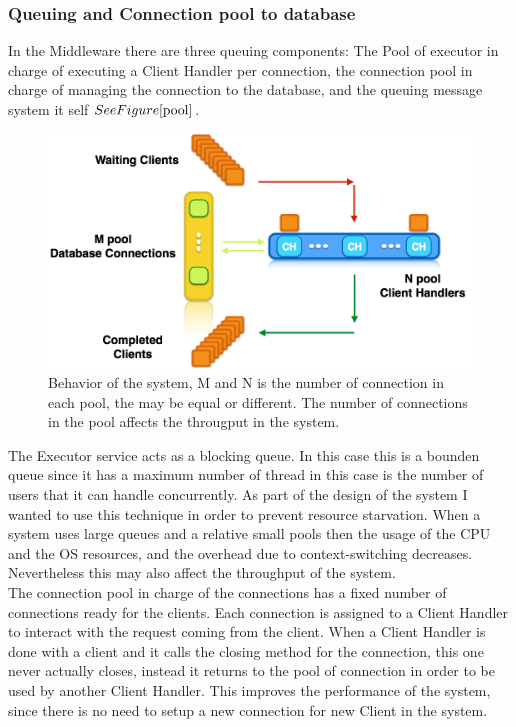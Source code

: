 \subsubsection{Queuing and Connection pool to database}\label{sec:queuing-and-connection-pool-to-database}
In the Middleware there are three queuing components: The Pool of executor in charge of executing a Client Handler per connection, the connection pool in charge of managing the connection to the database, and the queuing message system it self \( See Figure \ref{pool} \).\\

\begin{figure}[h!]
	\centering
	\includegraphics[scale=0.3]{connpool.png}
	\caption{Behavior of the system, M and N is the number of connection in each pool, the may be equal or different. The number of connections in the pool affects the througput in the system.}
	\label{pool}
\end{figure}

The Executor service acts as a blocking queue. In this case this is a bounden queue since it has a maximum number of thread in this case is the number of users that it can handle concurrently. As part of the design of the system I wanted to use this technique in order to prevent resource starvation. When a system uses large queues and a relative small pools then the usage of the CPU and the OS resources, and the overhead due to context-switching decreases. Nevertheless this may also affect the throughput of the system.\\

The connection pool in charge of the connections has a fixed number of connections ready for the clients. Each connection is assigned to a Client Handler to interact with the request coming from the client. When a Client Handler is done with a client and it calls the closing method for the connection, this one never actually closes, instead it returns to the pool of connection in order to be used by another Client Handler. This improves the performance of the system, since there is no need to setup a new connection for new Client in the system.


